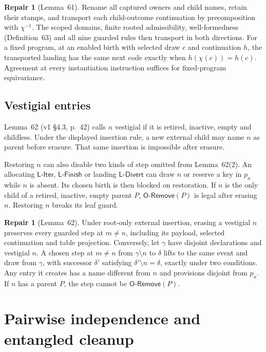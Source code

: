 \documentclass[11pt,a4paper]{article}
\theoremstyle{definition}
\newtheorem{repair}[definition]{Repair}
\theoremstyle{plain}
\newcommand{\ORemove}{\mathsf{O\text{-}Remove}}
\newcommand{\LIter}{\mathsf{L\text{-}Iter}}
\newcommand{\LFinish}{\mathsf{L\text{-}Finish}}
\newcommand{\LDivert}{\mathsf{L\text{-}Divert}}
\begin{document}
\begin{repair}[Lemma~61]
Rename all captured owners and child names, retain their stamps, and transport each child-outcome continuation by precomposition with $\chi^{-1}$. The scoped domains, finite rooted admissibility, well-formedness (Definition~63) and all nine guarded rules then transport in both directions.
For a fixed program, at an enabled birth with selected draw $c$ and continuation $h$, the transported landing has the same next code exactly when $h(\chi(c))=h(c)$. Agreement at every instantiation instruction suffices for fixed-program equivariance.
\end{repair}

\subsection{Vestigial entries}
\label{sec:vestigial}

Lemma~62 (v1 \S4.3, p.~42) calls $n$ vestigial if it is retired, inactive, empty and childless. Under the displayed insertion rule, a new external child may name $n$ as parent before erasure. That same insertion is impossible after erasure.

Restoring $n$ can also disable two kinds of step omitted from Lemma~62(2).
An allocating $\LIter$, $\LFinish$ or landing $\LDivert$ can draw $n$ or reserve a key in $p_n$ while $n$ is absent. Its chosen birth is then blocked on restoration. If $n$ is the only child of a retired, inactive, empty parent $P$, $\ORemove(P)$ is legal after erasing $n$. Restoring $n$ breaks its leaf guard.

\begin{repair}[Lemma~62]
Under root-only external insertion, erasing a vestigial $n$ preserves every guarded step at $m\ne n$, including its payload, selected continuation and table projection.
Conversely, let $\gamma$ have disjoint declarations and vestigial $n$. A chosen step at $m\ne n$ from $\gamma\setminus n$ to $\delta$ lifts to the same event and draw from $\gamma$, with successor $\delta'$ satisfying $\delta'\setminus n=\delta$, exactly under two conditions. Any entry it creates has a name different from $n$ and provisions disjoint from $p_n$. If $n$ has a parent $P$, the step cannot be $\ORemove(P)$.
\end{repair}

\section{Pairwise independence and entangled cleanup}
\label{sec:temporal}
\end{document}
